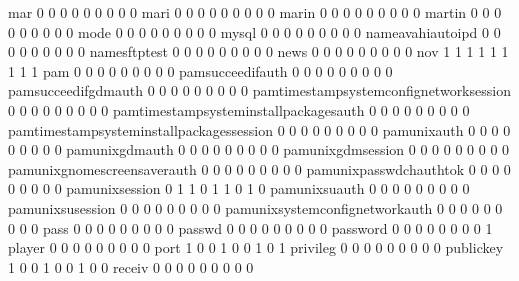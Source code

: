 \documentclass[compress,8pt]{beamer}
\begin{document}
\begin{frame}
\begin{Schunk}
  mar                                        0   0   0   0   0   0   0   0   0
  mari                                       0   0   0   0   0   0   0   0   0
  marin                                      0   0   0   0   0   0   0   0   0
  martin                                     0   0   0   0   0   0   0   0   0
  mode                                       0   0   0   0   0   0   0   0   0
  mysql                                      0   0   0   0   0   0   0   0   0
  nameavahiautoipd                           0   0   0   0   0   0   0   0   0
  namesftptest                               0   0   0   0   0   0   0   0   0
  news                                       0   0   0   0   0   0   0   0   0
  nov                                        1   1   1   1   1   1   1   1   1
  pam                                        0   0   0   0   0   0   0   0   0
  pamsucceedifauth                           0   0   0   0   0   0   0   0   0
  pamsucceedifgdmauth                        0   0   0   0   0   0   0   0   0
  pamtimestampsystemconfignetworksession     0   0   0   0   0   0   0   0   0
  pamtimestampsysteminstallpackagesauth      0   0   0   0   0   0   0   0   0
  pamtimestampsysteminstallpackagessession   0   0   0   0   0   0   0   0   0
  pamunixauth                                0   0   0   0   0   0   0   0   0
  pamunixgdmauth                             0   0   0   0   0   0   0   0   0
  pamunixgdmsession                          0   0   0   0   0   0   0   0   0
  pamunixgnomescreensaverauth                0   0   0   0   0   0   0   0   0
  pamunixpasswdchauthtok                     0   0   0   0   0   0   0   0   0
  pamunixsession                             0   1   1   0   1   1   0   1   0
  pamunixsuauth                              0   0   0   0   0   0   0   0   0
  pamunixsusession                           0   0   0   0   0   0   0   0   0
  pamunixsystemconfignetworkauth             0   0   0   0   0   0   0   0   0
  pass                                       0   0   0   0   0   0   0   0   0
  passwd                                     0   0   0   0   0   0   0   0   0
  password                                   0   0   0   0   0   0   0   0   1
  player                                     0   0   0   0   0   0   0   0   0
  port                                       1   0   0   1   0   0   1   0   1
  privileg                                   0   0   0   0   0   0   0   0   0
  publickey                                  1   0   0   1   0   0   1   0   0
  receiv                                     0   0   0   0   0   0   0   0   0

\end{Schunk}
\end{frame}
\end{document}
